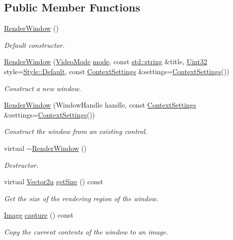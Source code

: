 \subsection*{Public Member Functions}
\begin{DoxyCompactItemize}
\item 
\hyperlink{classsf_1_1_render_window_a839bbf336bdcafb084dafc3076fc9021}{Render\-Window} ()
\begin{DoxyCompactList}\small\item\em Default constructor. \end{DoxyCompactList}\item 
\hyperlink{classsf_1_1_render_window_a828cf38403a246c11ae98a316f271941}{Render\-Window} (\hyperlink{classsf_1_1_video_mode}{Video\-Mode} \hyperlink{gl3_8h_a1e71d9c196e4683cc06c4b54d53f7ef5}{mode}, const \hyperlink{gl3_8h_ac83513893df92266f79a515488701770}{std\-::string} \&title, \hyperlink{namespacesf_aa746fb1ddef4410bddf198ebb27e727c}{Uint32} style=\hyperlink{group__window_ggae1db07091f9745bd223882ba55e7fae2a5597cd420fc461807e4a201c92adea37}{Style\-::\-Default}, const \hyperlink{structsf_1_1_context_settings}{Context\-Settings} \&settings=\hyperlink{structsf_1_1_context_settings}{Context\-Settings}())
\begin{DoxyCompactList}\small\item\em Construct a new window. \end{DoxyCompactList}\item 
\hyperlink{classsf_1_1_render_window_a25c0af7d515e710b6eebc9c6be952aa5}{Render\-Window} (Window\-Handle handle, const \hyperlink{structsf_1_1_context_settings}{Context\-Settings} \&settings=\hyperlink{structsf_1_1_context_settings}{Context\-Settings}())
\begin{DoxyCompactList}\small\item\em Construct the window from an existing control. \end{DoxyCompactList}\item 
virtual \hyperlink{classsf_1_1_render_window_a3407e36bfc1752d723140438a825365c}{$\sim$\-Render\-Window} ()
\begin{DoxyCompactList}\small\item\em Destructor. \end{DoxyCompactList}\item 
virtual \hyperlink{namespacesf_aaa02ba42bf79b001a376fe9d79254cb3}{Vector2u} \hyperlink{classsf_1_1_render_window_a2c7ff414be32621a453745cf2a0f8a3e}{get\-Size} () const 
\begin{DoxyCompactList}\small\item\em Get the size of the rendering region of the window. \end{DoxyCompactList}\item 
\hyperlink{classsf_1_1_image}{Image} \hyperlink{classsf_1_1_render_window_a9bd8655d0bac83145bfc329ea7a6d538}{capture} () const 
\begin{DoxyCompactList}\small\item\em Copy the current contents of the window to an image. \end{DoxyCompactList}\end{DoxyCompactItemize}
